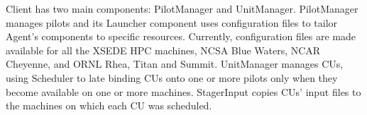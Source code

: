 \documentclass[preprint,12pt, a4paper]{elsarticle}
\begin{document}


Client has two main components: PilotManager and UnitManager. PilotManager
manages pilots and its Launcher component uses configuration files to tailor
Agent's components to specific resources. Currently, configuration files are
made available for all the XSEDE HPC machines, NCSA Blue Waters, NCAR
Cheyenne, and ORNL Rhea, Titan and Summit. 
%
UnitManager manages CUs, using Scheduler to late binding CUs onto one or more
pilots only when they become available on one or more machines. StagerInput
copies CUs' input files to the machines on which each CU was scheduled.

\end{document}
